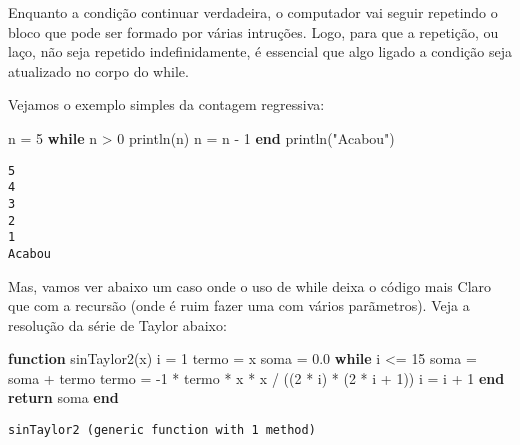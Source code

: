 \documentclass[
  letterpaper,
  DIV=11,
  numbers=noendperiod]{scrreprt}
\newenvironment{Shaded}{\begin{snugshade}}{\end{snugshade}}
\newcommand{\ControlFlowTok}[1]{\textcolor[rgb]{0.00,0.23,0.31}{\textbf{#1}}}
\newcommand{\FloatTok}[1]{\textcolor[rgb]{0.68,0.00,0.00}{#1}}
\newcommand{\FunctionTok}[1]{\textcolor[rgb]{0.28,0.35,0.67}{#1}}
\newcommand{\KeywordTok}[1]{\textcolor[rgb]{0.00,0.23,0.31}{\textbf{#1}}}
\newcommand{\NormalTok}[1]{\textcolor[rgb]{0.00,0.23,0.31}{#1}}
\newcommand{\OperatorTok}[1]{\textcolor[rgb]{0.37,0.37,0.37}{#1}}
\newcommand{\StringTok}[1]{\textcolor[rgb]{0.13,0.47,0.30}{#1}}
\begin{document}
Enquanto a condição continuar verdadeira, o computador vai seguir
repetindo o bloco que pode ser formado por várias intruções. Logo, para
que a repetição, ou laço, não seja repetido indefinidamente, é essencial
que algo ligado a condição seja atualizado no corpo do while.

Vejamos o exemplo simples da contagem regressiva:

\begin{Shaded}
\begin{Highlighting}[]
\NormalTok{n }\OperatorTok{=} \FloatTok{5}
\ControlFlowTok{while}\NormalTok{ n }\OperatorTok{\textgreater{}} \FloatTok{0}
  \FunctionTok{println}\NormalTok{(n)}
\NormalTok{  n }\OperatorTok{=}\NormalTok{ n }\OperatorTok{{-}} \FloatTok{1}
\ControlFlowTok{end}
\FunctionTok{println}\NormalTok{(}\StringTok{"Acabou"}\NormalTok{)}
\end{Highlighting}
\end{Shaded}

\begin{verbatim}
5
4
3
2
1
Acabou
\end{verbatim}

Mas, vamos ver abaixo um caso onde o uso de while deixa o código mais
Claro que com a recursão (onde é ruim fazer uma com vários parãmetros).
Veja a resolução da série de Taylor abaixo:

\begin{Shaded}
\begin{Highlighting}[]
 \KeywordTok{function} \FunctionTok{sinTaylor2}\NormalTok{(x)}
\NormalTok{   i }\OperatorTok{=} \FloatTok{1}
\NormalTok{   termo }\OperatorTok{=}\NormalTok{ x}
\NormalTok{   soma }\OperatorTok{=} \FloatTok{0.0}
   \ControlFlowTok{while}\NormalTok{ i }\OperatorTok{\textless{}=} \FloatTok{15}
\NormalTok{     soma }\OperatorTok{=}\NormalTok{ soma }\OperatorTok{+}\NormalTok{ termo}
\NormalTok{     termo }\OperatorTok{=} \OperatorTok{{-}}\FloatTok{1} \OperatorTok{*}\NormalTok{ termo }\OperatorTok{*}\NormalTok{ x }\OperatorTok{*}\NormalTok{ x }\OperatorTok{/}\NormalTok{ ((}\FloatTok{2} \OperatorTok{*}\NormalTok{ i) }\OperatorTok{*}\NormalTok{ (}\FloatTok{2} \OperatorTok{*}\NormalTok{ i }\OperatorTok{+} \FloatTok{1}\NormalTok{))}
\NormalTok{     i }\OperatorTok{=}\NormalTok{ i }\OperatorTok{+} \FloatTok{1}
   \ControlFlowTok{end}
   \ControlFlowTok{return}\NormalTok{ soma}
\KeywordTok{end}
\end{Highlighting}
\end{Shaded}

\begin{verbatim}
sinTaylor2 (generic function with 1 method)
\end{verbatim}
\end{document}
